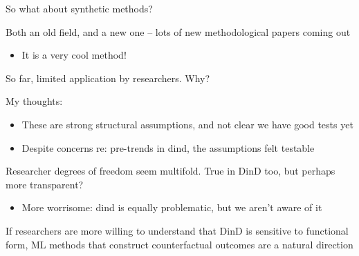 \documentclass[notes,11pt, aspectratio=169]{beamer}
\newenvironment{wideitemize}{\itemize\addtolength{\itemsep}{10pt}}{\enditemize}
\begin{document}
\begin{frame}{So what about synthetic methods?}
  \begin{wideitemize}
  \item Both an old field, and a new one -- lots of new methodological papers coming out
    \begin{itemize}
    \item It is a very cool method!
    \end{itemize}
  \item So far, limited application by researchers. Why?
  \item  My thoughts:
    \begin{itemize}
    \item These are strong structural assumptions, and not clear we
      have good tests yet
    \item Despite concerns re: pre-trends in dind, the assumptions
      felt testable
    \end{itemize}
  \item Researcher degrees of freedom seem multifold. True in DinD
    too, but perhaps more transparent?
    \begin{itemize}
    \item More worrisome: dind is equally problematic, but we aren't
      aware of it
    \end{itemize}
  \item If researchers are more willing to understand that DinD is
    sensitive to functional form, ML methods that construct
    counterfactual outcomes are a natural direction
  \end{wideitemize}
\end{frame}
\end{document}
